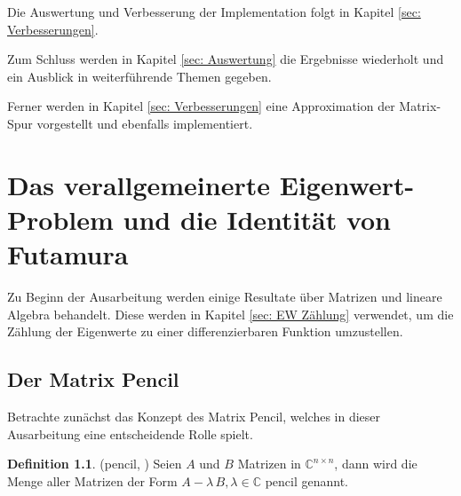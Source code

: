 \documentclass[a4paper,12pt]{report}
\newcommand{\C}{\mathbb C}
\newcommand{\AlamB}{A-\lambda\,B}
\theoremstyle{plain} %
\theoremstyle{definition} %
\newtheorem{definition}[theorem]{Definition}
\theoremstyle{remark}
\begin{document}

      Die Auswertung und Verbesserung der Implementation folgt in Kapitel \ref{sec: Verbesserungen}.



      Zum Schluss werden in Kapitel \ref{sec: Auswertung} die Ergebnisse wiederholt und ein Ausblick in weiterführende Themen gegeben.

      Ferner werden in Kapitel \ref{sec: Verbesserungen} eine Approximation der Matrix-Spur vorgestellt und ebenfalls implementiert.

\chapter{Das verallgemeinerte Eigenwert-Problem und die Identität von Futamura}
\label{sec: EW Problem_Futamura}

      Zu Beginn der Ausarbeitung werden einige Resultate über Matrizen und lineare Algebra behandelt.
      Diese werden in Kapitel \ref{sec: EW Zählung} verwendet, um die Zählung der Eigenwerte zu einer differenzierbaren Funktion umzustellen.
      
      \section{Der Matrix Pencil}
            Betrachte zunächst das Konzept des Matrix Pencil, welches in dieser Ausarbeitung eine entscheidende Rolle spielt.
            \begin{definition}(pencil, \cite[S. 375]{matrixGolub})
                  \label{def: pencil}
                  Seien $A$ und $B$ Matrizen in $\C^{n\times n}$, dann wird die Menge aller Matrizen der Form
                  $\AlamB, \lambda \in \C$ pencil genannt.
            \end{definition}
\end{document}
